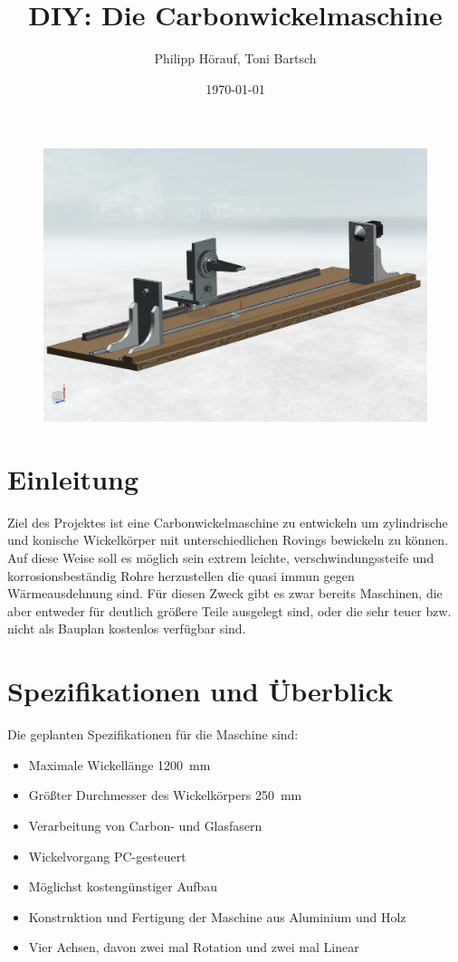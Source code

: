 \documentclass[paper=A4,pagesize,DIV=18, 12pt,listof=totoc,bibliography=totoc,headings=optiontohead,open=any]{article}
\date{\today}
\author{Philipp Hörauf, Toni Bartsch}
\title{DIY: Die Carbonwickelmaschine}
\begin{document}
\maketitle
\thispagestyle{empty}
\vspace*{15mm}
\begin{figure}[H]
	\centering
	\includegraphics[width=1\textwidth]{NX_Screenshots/gesamt3.png}
\end{figure}


\newpage
\tableofcontents
\newpage

\section{Einleitung}
Ziel des Projektes ist eine Carbonwickelmaschine zu entwickeln um zylindrische und konische Wickelkörper mit unterschiedlichen Rovings bewickeln zu können. Auf diese Weise soll es möglich sein extrem leichte, verschwindungssteife und korrosionsbeständig Rohre herzustellen die quasi immun gegen Wärmeausdehnung sind. Für diesen Zweck gibt es zwar bereits Maschinen, die aber entweder für deutlich größere Teile ausgelegt sind, oder die sehr teuer bzw. nicht als Bauplan kostenlos verfügbar sind.

\section{Spezifikationen und Überblick}
Die geplanten Spezifikationen für die Maschine sind:

\begin{itemize}
    \item Maximale Wickellänge \SI{1200}{\milli\metre}
    \item Größter Durchmesser des Wickelkörpers \SI{250}{\milli\metre}
    \item Verarbeitung von Carbon- und Glasfasern
    \item Wickelvorgang PC-gesteuert
    \item Möglichst kostengünstiger Aufbau
    \item Konstruktion und Fertigung der Maschine aus Aluminium und Holz
    \item Vier Achsen, davon zwei mal Rotation und zwei mal Linear
\end{itemize}
\end{document}
